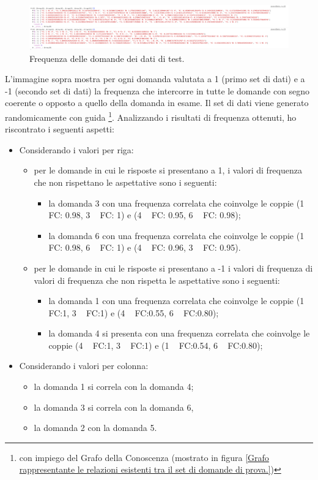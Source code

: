 \noindent
\begin{figure}[H]
\centering
	\includegraphics[width=1\linewidth]{./image/res_frequenceMatrix_OSS.png}
	\caption{Frequenza delle domande dei dati di test.}
	\label{Frequenza delle domande dei dati di test.}
\end{figure}

L'immagine sopra mostra per ogni domanda valutata a 1 (primo set di dati) e a -1 (secondo set di dati) la frequenza che intercorre in tutte le domande con segno coerente o opposto a quello della domanda in esame.
Il set di dati viene generato randomicamente con guida \footnote{con impiego del Grafo della Conoscenza (mostrato in figura \ref{Grafo rappresentante le relazioni esistenti tra il set di domande di prova.})}.
Analizzando i risultati di frequenza ottenuti, ho riscontrato i seguenti aspetti:
\begin{itemize}
\item Considerando i valori per riga:
\begin{itemize}
\item per le domande in cui le risposte si presentano a 1, i valori di frequenza che non rispettano le aspettative sono i seguenti:
\begin{itemize}
\item la domanda 3  con una frequenza correlata che coinvolge le coppie (1 ~ FC: 0.98, 3 ~ FC: 1) e (4 ~ FC: 0.95, 6 ~ FC: 0.98);
\item la domanda 6 con una frequenza correlata che coinvolge le coppie (1 ~ FC: 0.98, 6 ~ FC: 1) e (4 ~ FC: 0.96, 3 ~ FC: 0.95).
\end{itemize}
\item per le domande in cui le risposte si presentano a -1 i valori di frequenza di valori di frequenza che non rispetta le aspettative sono i seguenti:
\begin{itemize}
\item la domanda 1 con una frequenza correlata che coinvolge le coppie (1 ~ FC:1, 3 ~ FC:1) e (4 ~ FC:0.55, 6 ~ FC:0.80);
\item la domanda 4 si presenta con una frequenza correlata che coinvolge le coppie (4 ~ FC:1, 3 ~ FC:1) e (1 ~ FC:0.54, 6 ~ FC:0.80);
\end{itemize}
\end{itemize}
\item Considerando i valori per colonna:
\begin{itemize}
\item la domanda 1 si correla con la domanda 4;
\item la domanda 3 si correla con la domanda 6, 
\item la domanda 2 con la domanda 5.
\end{itemize}
\end{itemize}
